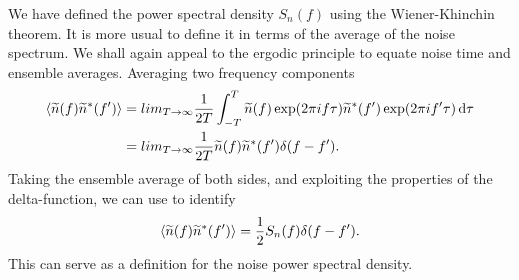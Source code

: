 We have defined the power spectral density $S_n(f)$ using the Wiener-Khinchin theorem. It is more usual to define it in terms of the average of the noise spectrum. We shall again appeal to the ergodic principle to equate noise time and ensemble averages. Averaging two frequency components
\begin{align}
\left\langle\widetilde{n}(f)\widetilde{n}^\ast(f')\right\rangle = {} & lim_{T \rightarrow \infty} \frac{1}{2T} \int_{-T}^{T}{\widetilde{n}(f)\exp(2\pi i f \tau)\widetilde{n}^\ast(f')\exp(2\pi i f' \tau)}\,\mathrm{d}{\tau} \nonumber \\
 = {} & lim_{T \rightarrow \infty} \frac{1}{2T} \widetilde{n}(f)\widetilde{n}^\ast(f')\delta(f-f').
\end{align}
Taking the ensemble average of both sides, and exploiting the properties of the delta-function, we can use  to identify
\begin{equation}
\left\langle\widetilde{n}(f)\widetilde{n}^\ast(f')\right\rangle = \frac{1}{2} S_n(f)\delta(f-f').
\end{equation}
This can serve as a definition for the noise power spectral density.




